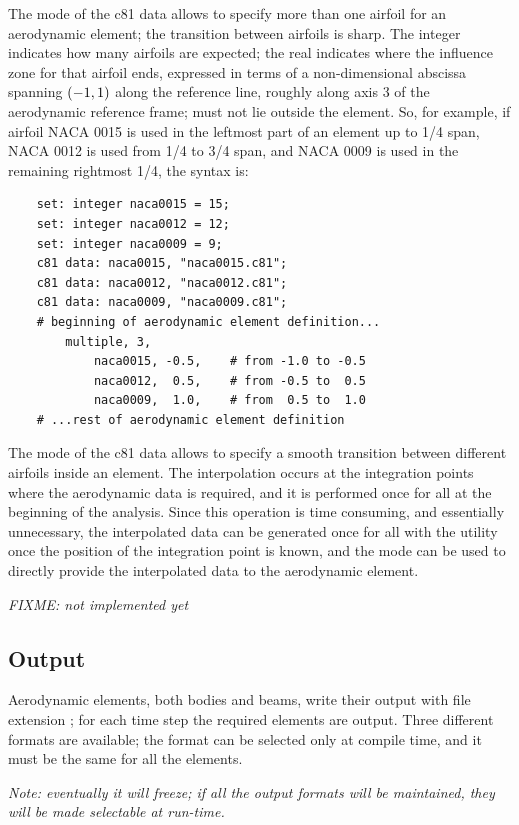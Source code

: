 The  mode of the c81 data allows to specify
more than one airfoil for an aerodynamic element; the transition
between airfoils is sharp.
The integer  indicates how many airfoils are expected;
the real  indicates where the influence zone for that
airfoil ends, expressed in terms of a non-dimensional abscissa spanning 
$\left( -1,1 \right)$ along the reference line, roughly along axis 3 
of the aerodynamic reference frame;  must not lie outside
the element.
So, for example, if airfoil NACA 0015 is used in the leftmost part
of an element up to 1/4 span, NACA 0012 is used from 1/4 to 3/4 span,
and NACA 0009 is used in the remaining rightmost 1/4, the syntax is:
\begin{verbatim}
    set: integer naca0015 = 15;
    set: integer naca0012 = 12;
    set: integer naca0009 = 9;
    c81 data: naca0015, "naca0015.c81";
    c81 data: naca0012, "naca0012.c81";
    c81 data: naca0009, "naca0009.c81";
    # beginning of aerodynamic element definition...
        multiple, 3,
            naca0015, -0.5,    # from -1.0 to -0.5
            naca0012,  0.5,    # from -0.5 to  0.5
            naca0009,  1.0,    # from  0.5 to  1.0
    # ...rest of aerodynamic element definition
\end{verbatim}

The  mode of the c81 data allows to specify 
a smooth transition between different airfoils inside an element.
The interpolation occurs at the integration points where the
aerodynamic data is required, and it is performed once for all
at the beginning of the analysis.
Since this operation is time consuming, and essentially unnecessary,
the interpolated data can be generated once for all with the utility
 once the position of the integration point is known,
and the  mode can be used to directly provide
the interpolated data to the aerodynamic element.

\noindent
\emph{FIXME: not implemented yet}


\subsection{Output}
Aerodynamic elements, both bodies and beams, write their output with file
extension ; for each time step the required elements are output.
Three different formats are available; the format can be selected only at
compile time, and it must be the same for all the elements. 

\noindent
\emph{Note: eventually it will freeze; if all the output formats will be
maintained, they will be made selectable at run-time.}

